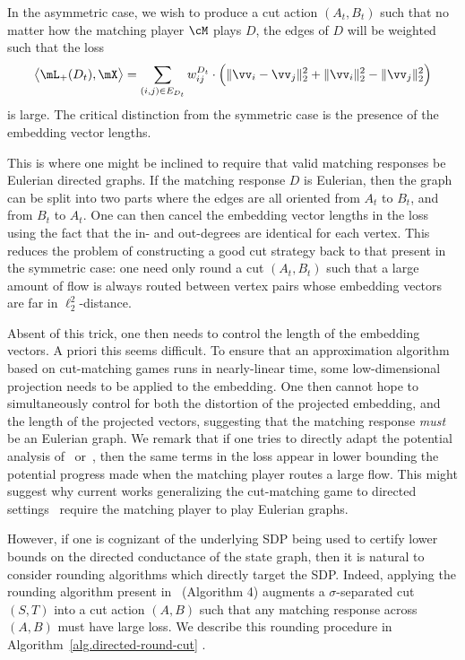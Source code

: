 \documentclass[letterpaper]{article}
\begin{document}
In the asymmetric case, we wish to produce a cut action $(A_t, B_t)$ such that no matter how the matching player $\cM$ plays $D$, the edges of $D$ will be weighted such that the loss
\begin{equation*}
\big\langle \mL_{+}(D_t), \mX \big\rangle
= \sum_{(i, j) \in E_{D_t}} w^{D_t}_{ij} \cdot \Big( \lVert \vv_{i} - \vv_{j} \rVert_2^2 + \lVert \vv_{i} \rVert_2^2 - \lVert \vv_{j} \rVert_2^2 \Big)
\end{equation*}
is large. The critical distinction from the symmetric case is the presence of the embedding vector lengths.

This is where one might be inclined to require that valid matching responses be Eulerian directed graphs. If the matching response $D$ is Eulerian, then the graph can be split into two parts where the edges are all oriented from $A_t$ to $B_t$, and from $B_t$ to $A_t$. One can then cancel the embedding vector lengths in the loss using the fact that the in- and out-degrees are identical for each vertex. This reduces the problem of constructing a good cut strategy back to that present in the symmetric case: one need only round a cut $(A_t, B_t)$ such that a large amount of flow is always routed between vertex pairs whose embedding vectors are far in $\ell_2^2$-distance.

Absent of this trick, one then needs to control the length of the embedding vectors. A priori this seems difficult. To ensure that an approximation algorithm based on cut-matching games runs in nearly-linear time, some low-dimensional projection needs to be applied to the embedding. One then cannot hope to simultaneously control for both the distortion of the projected embedding, and the length of the projected vectors, suggesting that the matching response \emph{must} be an Eulerian graph. We remark that if one tries to directly adapt the potential analysis of~\cite{khandekarGraphPartitioningUsing2009} or~\cite{orecchiaPartitioningGraphsSingle2008}, then the same terms in the loss appear in lower bounding the potential progress made when the matching player routes a large flow. This might suggest why current works generalizing the cut-matching game to directed settings~\cite{louis2010cut, lau2023fast} require the matching player to play Eulerian graphs.

However, if one is cognizant of the underlying SDP being used to certify lower bounds on the directed conductance of the state graph, then it is natural to consider rounding algorithms which directly target the SDP. Indeed, applying the rounding algorithm present in~\cite{agarwal2005log} (Algorithm 4) augments a $\sigma$-separated cut $(S, T)$ into a cut action $(A, B)$ such that any matching response across $(A, B)$ must have large loss. We describe this rounding procedure in Algorithm~\ref{alg.directed-round-cut} \dirroundcut.
\end{document}
